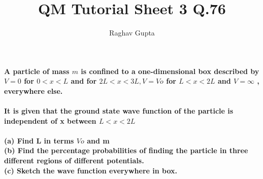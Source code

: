 \documentclass{article}
\begin{document}
\title{QM Tutorial Sheet 3 Q.76}
\author{Raghav Gupta}
\maketitle

\textbf{A particle of mass \(m\) is confined to a one-dimensional box described by \(V=0\) for \(0<x<L\) and for
\(2L<x<3L, V=Vo\) for \(L<x<2L\) and \(V=\infty\) , everywhere else.\\\\It is given that the ground state wave
function of the particle is independent of
x between \(L<x<2L\)\\\\
(a) Find L in terms \(Vo\) and m\\
(b) Find the percentage probabilities of
finding the particle in three different
regions of different potentials.\\
(c) Sketch the wave function
everywhere in box.}\\\\
\end{document}
